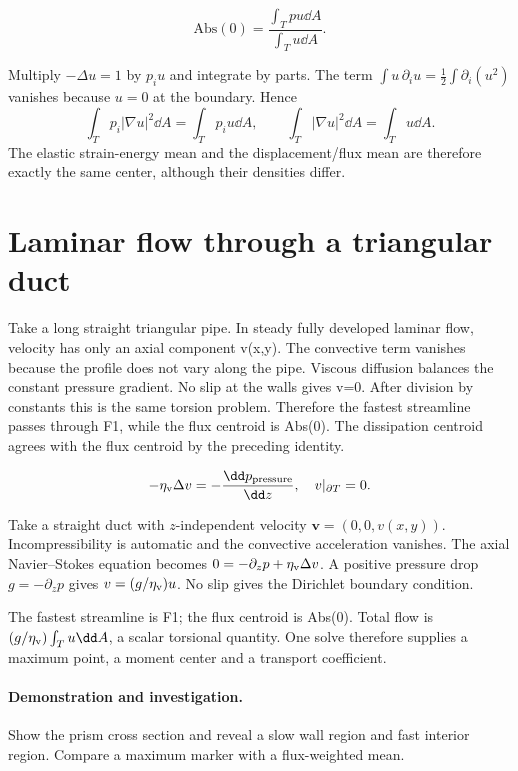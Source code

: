 \documentclass[11pt,oneside,openany]{book}
\begin{document}
\[\mathrm{Abs}(0)=\frac{\int_Tpu\dd A}{\int_Tu\dd A}.\]


Multiply $-\Delta u=1$ by $p_i u$ and integrate by parts.
The term $\int u\,\partial_i u=\frac12\int\partial_i(u^2)$ vanishes
because $u=0$ at the boundary. Hence
\[
\int_Tp_i|\nabla u|^2\dd A=\int_Tp_i u\dd A,\qquad
\int_T|\nabla u|^2\dd A=\int_Tu\dd A.
\]
The elastic strain-energy mean and the displacement/flux mean are
therefore exactly the same center, although their densities differ.



\section{Laminar flow through a triangular duct}\label{sec:slide37}

Take a long straight triangular pipe. In steady fully developed laminar flow, velocity has only an axial component v(x,y). The convective term vanishes because the profile does not vary along the pipe. Viscous diffusion balances the constant pressure gradient. No slip at the walls gives v=0. After division by constants this is the same torsion problem. Therefore the fastest streamline passes through F1, while the flux centroid is Abs(0). The dissipation centroid agrees with the flux centroid by the preceding identity.


\[-\eta_{\rm v}\Delta v=-\frac{\dd p_{\rm pressure}}{\dd z},\quad v|_{\partial T}=0.\]



Take a straight duct with $z$-independent velocity
$\mathbf v=(0,0,v(x,y))$. Incompressibility is automatic and the
convective acceleration vanishes. The axial Navier--Stokes equation
becomes $0=-\partial_zp+\eta_{\rm v}\Delta v$.
A positive pressure drop $g=-\partial_zp$ gives
$v=(g/\eta_{\rm v})u$. No slip gives the Dirichlet boundary condition.

The fastest streamline is F1; the flux centroid is Abs(0).
Total flow is $(g/\eta_{\rm v})\int_Tu\dd A$, a scalar torsional
quantity. One solve therefore supplies a maximum point, a moment
center and a transport coefficient.




\paragraph{Demonstration and investigation.} Show the prism cross section and reveal a slow wall region and fast interior region. Compare a maximum marker with a flux-weighted mean.
\end{document}
